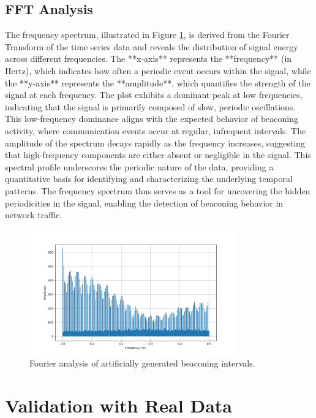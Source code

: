 \subsection{FFT Analysis}

The frequency spectrum, illustrated in Figure \ref{fig:furier}, is derived from the Fourier Transform of the time series data and reveals the distribution of signal energy across different frequencies. The **x-axis** represents the **frequency** (in Hertz), which indicates how often a periodic event occurs within the signal, while the **y-axis** represents the **amplitude**, which quantifies the strength of the signal at each frequency. The plot exhibits a dominant peak at low frequencies, indicating that the signal is primarily composed of slow, periodic oscillations. This low-frequency dominance aligns with the expected behavior of beaconing activity, where communication events occur at regular, infrequent intervals. The amplitude of the spectrum decays rapidly as the frequency increases, suggesting that high-frequency components are either absent or negligible in the signal. This spectral profile underscores the periodic nature of the data, providing a quantitative basis for identifying and characterizing the underlying temporal patterns. The frequency spectrum thus serves as a tool for uncovering the hidden periodicities in the signal, enabling the detection of beaconing behavior in network traffic.

\begin{figure}
    \centering
    \includegraphics[width=0.8\textwidth]{../Thesis_Docs/media/furier.png}
    \caption{Fourier analysis of artificially generated beaconing intervals.}
    \label{fig:furier}
\end{figure} 

\section{Validation with Real Data}


